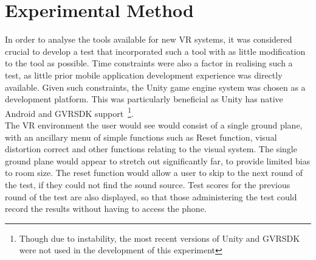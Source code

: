 \documentclass[paper=a4, fontsize=10pt, font=arial]{scrartcl} %
\numberwithin{equation}{section} %
\numberwithin{figure}{section} %
\numberwithin{table}{section} %
\begin{document}

\newpage

\section{Experimental Method}

In order to analyse the tools available for new VR systems, it was considered crucial to develop a test that incorporated such a tool with as little modification to the tool as possible. Time constraints were also a factor in realising such a test, as little prior mobile application development experience was directly available. Given such constraints, the Unity game engine system was chosen as a development platform. This was particularly beneficial as Unity has native Android and GVRSDK support~\footnote{Though due to instability, the most recent versions of Unity and GVRSDK were not used in the development of this experiment}.\\

The VR environment the user would see would consist of a single ground plane, with an ancillary menu of simple functions such as Reset function, visual distortion correct and other functions relating to the visual system. The single ground plane would appear to stretch out significantly far, to provide limited bias to room size. The reset function would allow a user to skip to the next round of the test, if they could not find the sound source. Test scores for the previous round of the test are also displayed, so that those administering the test could record the results without having to access the phone.

\end{document}
